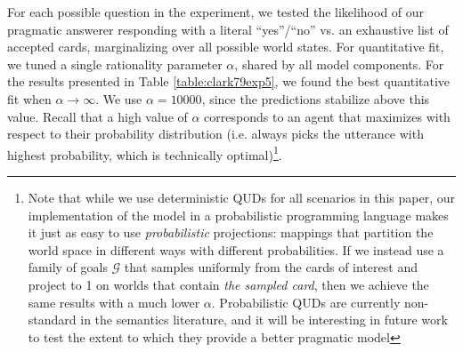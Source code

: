 \documentclass[12pt, floatsintext, jou]{apa6}
\begin{document}
For each possible question in the experiment, we tested the likelihood of our pragmatic answerer responding with a literal ``yes''/``no'' vs. an exhaustive list of accepted cards, marginalizing over all possible world states. For quantitative fit, we tuned a single rationality parameter $\alpha$, shared by all model components. For the results presented in Table \ref{table:clark79exp5}, we found the best quantitative fit when $\alpha \rightarrow \infty$. We use $\alpha = 10000$, since the predictions stabilize above this value. Recall that a high value of $\alpha$ corresponds to an agent that maximizes with respect to their probability distribution (i.e. always picks the utterance with highest probability, which is technically optimal)\footnote{Note that while we use deterministic QUDs for all scenarios in this paper, our implementation of the model in a probabilistic programming language makes it just as easy to use \emph{probabilistic} projections: mappings that partition the world space in different ways with different probabilities. If we instead use a family of goals $\mathcal{G}$ that samples uniformly from the cards of interest and project to 1 on worlds that contain \emph{the sampled card}, then we achieve the same results with a much lower $\alpha$. Probabilistic QUDs are currently non-standard in the semantics literature, and it will be interesting in future work to test the extent to which they provide a better pragmatic model}. 
\end{document}
